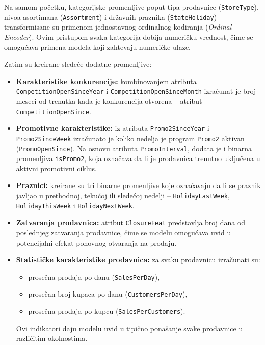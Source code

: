 \documentclass[12pt]{article}
\begin{document}
Na samom početku, kategorijske promenljive poput tipa prodavnice (\texttt{StoreType}), nivoa asortimana (\texttt{Assortment}) i državnih praznika (\texttt{StateHoliday}) transformisane su primenom jednostavnog ordinalnog kodiranja (\textit{Ordinal Encoder}). Ovim pristupom svaka kategorija dobija numeričku vrednost, čime se omogućava primena modela koji zahtevaju numeričke ulaze.

Zatim su kreirane sledeće dodatne promenljive:

\begin{itemize}
    \item \textbf{Karakteristike konkurencije:} kombinovanjem atributa \texttt{CompetitionOpenSinceYear} i \texttt{CompetitionOpenSinceMonth} izračunat je broj meseci od trenutka kada je konkurencija otvorena – atribut \texttt{CompetitionOpenSince}.

    \item \textbf{Promotivne karakteristike:} iz atributa \texttt{Promo2SinceYear} i \texttt{Promo2SinceWeek} izračunato je koliko nedelja je program \texttt{Promo2} aktivan (\texttt{PromoOpenSince}). Na osnovu atributa \texttt{PromoInterval}, dodata je i binarna promenljiva \texttt{isPromo2}, koja označava da li je prodavnica trenutno uključena u aktivni promotivni ciklus.

    \item \textbf{Praznici:} kreirane su tri binarne promenljive koje označavaju da li se praznik javljao u prethodnoj, tekućoj ili sledećoj nedelji – \texttt{HolidayLastWeek}, \texttt{HolidayThisWeek} i \texttt{HolidayNextWeek}.

    \item \textbf{Zatvaranja prodavnica:} atribut \texttt{ClosureFeat} predstavlja broj dana od poslednjeg zatvaranja prodavnice, čime se modelu omogućava uvid u potencijalni efekat ponovnog otvaranja na prodaju.

    \item \textbf{Statističke karakteristike prodavnica:} za svaku prodavnicu izračunati su:
    \begin{itemize}
        \item prosečna prodaja po danu (\texttt{SalesPerDay}),
        \item prosečan broj kupaca po danu (\texttt{CustomersPerDay}),
        \item prosečna prodaja po kupcu (\texttt{SalesPerCustomers}).
    \end{itemize}
    Ovi indikatori daju modelu uvid u tipično ponašanje svake prodavnice u različitim okolnostima.


\end{itemize}
\end{document}
